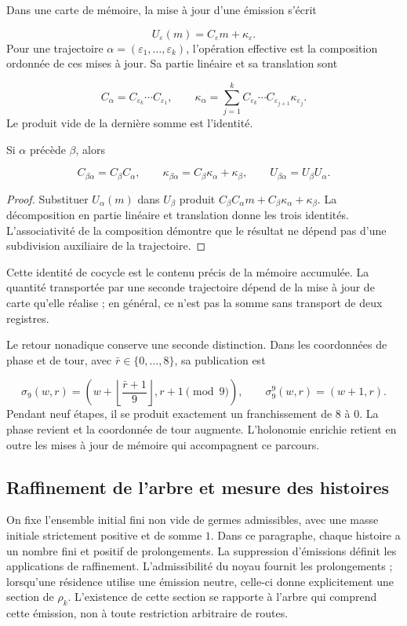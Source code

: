 Dans une carte de mémoire, la mise à jour d'une émission s'écrit

\[
U_\varepsilon(m)=C_\varepsilon m+\kappa_\varepsilon.
\]
Pour une trajectoire \(\alpha=(\varepsilon_1,\ldots,\varepsilon_k)\), l'opération effective est la composition ordonnée de ces mises à jour. Sa partie linéaire et sa translation sont

\[
C_\alpha=C_{\varepsilon_k}\cdots C_{\varepsilon_1},
\qquad
\kappa_\alpha=
\sum_{j=1}^{k}C_{\varepsilon_k}\cdots
C_{\varepsilon_{j+1}}\kappa_{\varepsilon_j}.
\]
Le produit vide de la dernière somme est l'identité.

\begin{proposition}
\label{x_reciprocidad:iv:cont:concatenacion}
Si \(\alpha\) précède \(\beta\), alors

\[
C_{\beta\alpha}=C_\beta C_\alpha,
\qquad
\kappa_{\beta\alpha}=C_\beta\kappa_\alpha+\kappa_\beta,
\qquad
U_{\beta\alpha}=U_\beta U_\alpha.
\]
\end{proposition}
\begin{proof}
Substituer \(U_\alpha(m)\) dans \(U_\beta\) produit \(C_\beta C_\alpha m+C_\beta\kappa_\alpha+\kappa_\beta\). La décomposition en partie linéaire et translation donne les trois identités. L'associativité de la composition démontre que le résultat ne dépend pas d'une subdivision auxiliaire de la trajectoire.
\end{proof}

Cette identité de cocycle est le contenu précis de la mémoire accumulée. La quantité transportée par une seconde trajectoire dépend de la mise à jour de carte qu'elle réalise ; en général, ce n'est pas la somme sans transport de deux registres.

Le retour nonadique conserve une seconde distinction. Dans les coordonnées de phase et de tour, avec \(\bar r\in\{0,\ldots,8\}\), sa publication est

\[
\sigma_9(w,r)=
\left(w+\left\lfloor\frac{\bar r+1}{9}\right\rfloor,
r+1\pmod9\right),
\qquad
\sigma_9^9(w,r)=(w+1,r).
\]
Pendant neuf étapes, il se produit exactement un franchissement de \(8\) à \(0\). La phase revient et la coordonnée de tour augmente. L'holonomie enrichie retient en outre les mises à jour de mémoire qui accompagnent ce parcours.

\subsection{Raffinement de l'arbre et mesure des histoires}
\label{x_reciprocidad:iv:cont:medida}
On fixe l’ensemble initial fini non vide de germes admissibles, avec une masse initiale strictement positive et de somme \(1\). Dans ce paragraphe, chaque histoire a un nombre fini et positif de prolongements. La suppression d’émissions définit les applications de raffinement. L’admissibilité du noyau fournit les prolongements ; lorsqu’une résidence utilise une émission neutre, celle-ci donne explicitement une section de \(\rho_k\). L’existence de cette section se rapporte à l’arbre qui comprend cette émission, non à toute restriction arbitraire de routes.

